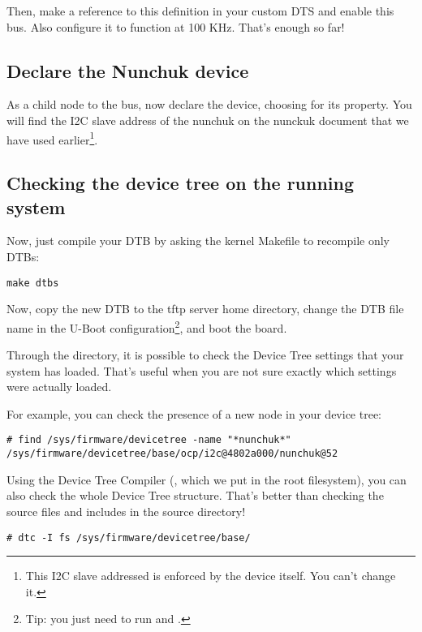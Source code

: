 Then, make a reference to this definition in your custom DTS and
enable this bus. Also configure it to function at 100 KHz. That's
enough so far!

\subsection{Declare the Nunchuk device}

As a child node to the  bus, now declare the 
device, choosing  for its 
property. You will find the I2C slave address of the nunchuk on the
nunckuk document that we have used earlier\footnote{This I2C slave
addressed is enforced by the device itself. You can't change it.}.

\subsection{Checking the device tree on the running system}

Now, just compile your DTB by asking the kernel Makefile to recompile
only DTBs:

\begin{verbatim}
make dtbs
\end{verbatim}

Now, copy the new DTB to the tftp server home directory, change the DTB
file name in the U-Boot configuration\footnote{Tip: you just need to run
 and .}, and boot the board.

Through the  directory, it is possible to check
the Device Tree settings that your system has loaded. That's useful when
you are not sure exactly which settings were actually loaded.

For example, you can check the presence of a new  node in
your device tree:

\begin{verbatim}
# find /sys/firmware/devicetree -name "*nunchuk*"
/sys/firmware/devicetree/base/ocp/i2c@4802a000/nunchuk@52
\end{verbatim}

Using the Device Tree Compiler (, which we put in the root
filesystem), you can also check the whole Device Tree structure. That's
better than checking the source files and includes in the source
directory!

\begin{verbatim}
# dtc -I fs /sys/firmware/devicetree/base/
\end{verbatim}

